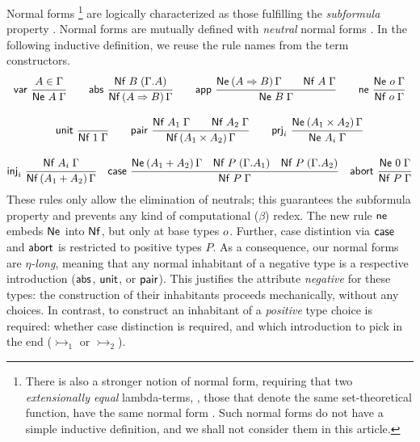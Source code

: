 \documentclass[a4paper,USenglish,cleveref, autoref]{lipics-v2019}
\begin{document}
Normal forms%
\footnote{%
There is also a stronger
notion of normal form, requiring that two \emph{extensionally equal}
lambda-terms, \ie, those that denote the
same set-theoretical function, have the same normal form
\cite{mitchell:foundations,altenkirchDybjerHofmannScott:lics01,scherer:popl17}.
Such normal forms do not have a simple inductive definition, and we
shall not consider them in this article.
}
are logically characterized as those fulfilling the
\emph{subformula} property \cite{prawitz:natded,matthes:shortproofs}.
Normal forms  are mutually defined with
\emph{neutral} normal forms .
In the following inductive definition, we reuse the rule names from the
term constructors.
\begin{gather*}
  \nru{\tvar}{A \in \Gamma}{\Ne A \Gamma}
\qquad
  \nru{\tabs}{\NfC B {\cext \Gamma A}}{\NfP {A \To B} \Gamma}
\qquad
  \nru{\tapp}
    {\NeP {A \To B} \Gamma \qquad \Nf A \Gamma}
    {\Ne B \Gamma}
\qquad
  \nru{\tne}{\Ne \tybase \Gamma}{\Nf \tybase \Gamma}
\\[2ex]
  \nru{\tunit}{}{\Nf \tyone \Gamma}
\qquad
  \nru{\tpair}
    {\Nf {A_1} \Gamma \qquad \Nf {A_2} \Gamma}
    {\NfP {A_1 \times A_2} \Gamma}
\qquad
  \nru{\tprj_i}
    {\NeP {A_1 \times A_2} \Gamma}
    {\Ne {A_i} \Gamma}
\\[2ex]
  \nru{\tinj_i}
    {\Nf {A_i} \Gamma}
    {\NfP {A_1 + A_2} \Gamma}
\quad
  \nru{\tcase}
    {\NeP {A_1 + A_2} \Gamma
      \quad \NfC P {\cext \Gamma A_1}
      \quad \NfC P {\cext \Gamma A_2}
    }{\Nf P \Gamma}
\quad
  \nru{\tabort}
    {\Ne \tyzero \Gamma}
    {\Nf P \Gamma}
\end{gather*}
These rules only allow the elimination of neutrals; this guarantees
the subformula property and prevents any kind of computational
($\beta$) redex.
The new rule $\mathsf{ne}$ embeds $\mathsf{Ne}^{}$ into $\mathsf{Nf}$,
but only at base types $o$.
Further, case distintion via $\mathsf{case}$ and $\mathsf{abort}$
is restricted to positive types $P$.
As a consequence, our normal forms are
\emph{$\eta$-long}, meaning that any normal inhabitant of a negative
type is a respective introduction ($\mathsf{abs}$, $\mathsf{unit}$, or $\mathsf{pair}$).
This justifies the attribute \emph{negative} for these types:
the construction of their inhabitants proceeds mechanically, without
any choices.  In contrast, to construct an inhabitant of a
\emph{positive} type choice is required: whether case distinction is
required, and which introduction to pick in the end ($\tinj_1$ or $\tinj_2$).
\end{document}
